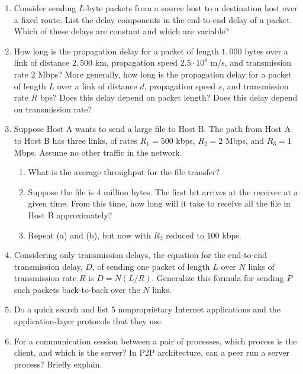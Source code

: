 \begin{enumerate}

  \item Consider sending $L$-byte packets from a source host to a destination host over a fixed route. List the delay components in the end-to-end delay of a packet. Which of these delays are constant and which are variable?
    
  \item How long is the propagation delay for a packet of length $1,000$ bytes over a link of distance $2,500$ km, propagation speed $2.5\cdot10^8$ m/s, and transmission rate $2$ Mbps? More generally, how long is the propagation delay for a packet of length $L$ over a link of distance $d$, propagation speed $s$, and transmission rate $R$ bps? Does this delay depend on packet length?  Does this delay depend on transmission rate?
    
  \item Suppose Host A wants to send a large file to Host B. The path from Host A to Host B has three links, of rates $R_1=500$ kbps, $R_2=2$ Mbps, and $R_3=1$ Mbps. Assume no other traffic in the network.

    \begin{enumerate}

      \item What is the average throughput for the file transfer?

      \item Suppose the file is 4 million bytes. The first bit arrives at the receiver at a given time. From this time, how long will it take to receive all the file in Host B approximately?

      \item Repeat (a) and (b), but now with $R_2$ reduced to $100$ kbps.

    \end{enumerate}
    
  \item Considering only transmission delays, the equation for the end-to-end transmission delay, $D$, of sending one packet of length $L$ over $N$ links of transmission rate $R$ is $D=N(L/R)$. Generalize this formula for sending $P$ such packets back-to-back over the $N$ links.
    
  \item Do a quick search and list 5 nonproprietary Internet applications and the application-layer protocols that they use.
    
  \item For a communication session between a pair of processes, which process is the client, and which is the server? In P2P architecture, can a peer run a server process? Briefly explain.
    

\end{enumerate}
